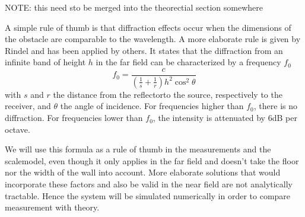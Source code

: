 NOTE: this need sto be merged into the theorectial section somewhere

A simple rule of thumb is that diffraction effects occur when the dimensions of the obstacle are comparable to the wavelength. A more elaborate rule is given by Rindel\cite{rindel-diffraction} and has been applied by others\cite{dave-diffraction, stage-acoustics}. It states that the diffraction from an infinite band of height $h$ in the far field can be characterized by a frequency $f_0$
\begin{equation}
\label{diffractionEq}
f_0 = \frac{c}{
	\left(\frac{1}{s} + \frac{1}{r}\right) h^2 \cos^2 \theta}
\end{equation}
with $s$ and $r$ the distance from the reflectorto the source, respectively to the receiver, and $\theta$ the angle of incidence. For frequencies higher than $f_0$, there is no diffraction. For frequencies lower than $f_0$, the intensity is attenuated by 6dB per octave. 

We will use this formula as a rule of thumb in the measurements and the scalemodel, even though it only applies in the far field and doesn't take the floor nor the width of the wall into account. More elaborate solutions that would incorporate these factors and also be valid in the near field are not analytically tractable. Hence the system will be simulated numerically in order to compare measurement with theory.


